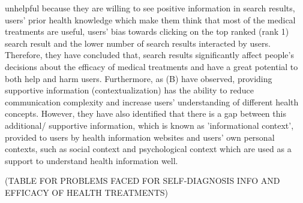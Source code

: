 \documentclass[]{article}
\begin{document}
unhelpful because they are willing to see positive information in search results, users' prior health knowledge which make them think that most of the medical treatments are useful, users' bias towards clicking on the top ranked (rank 1) search result and the lower number of search results interacted by users. Therefore, they have concluded that, search results significantly affect people’s decisions about the efficacy of medical treatments and have a great potential to both help and harm users. Furthermore, as (B) have observed, providing supportive information (contextualization) has the ability to reduce communication complexity and increase users' understanding of different health concepts. However, they have also identified that there is a gap between this additional/ supportive information, which is known as 'informational context', provided to users by health information websites and users' own personal contexts, such as social context and psychological context which are used as a support to understand health information well.     



(TABLE FOR PROBLEMS FACED FOR SELF-DIAGNOSIS INFO AND EFFICACY OF HEALTH TREATMENTS)
\end{document}
